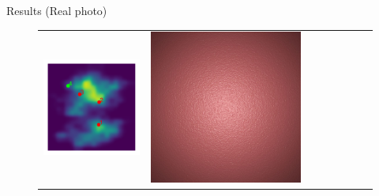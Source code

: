 \documentclass[final]{beamer}
\newlength{\twocolwid}
\newlength{\resultwidth}
\begin{document}
\begin{frame}[t]
\begin{columns}[t]
\begin{column}{\twocolwid}
\begin{block}{Results (Real photo)}
\begin{figure}[t]
\begin{tabular}{ccrclccc}
            		\includegraphics[width=\resultwidth]{images/real/bump/posterior.pdf} &
            		\includegraphics[width=\resultwidth]{images/real/bump/good1.jpg} &

\end{tabular}
\end{figure}
\end{block}
\end{column}
\end{columns}
\end{frame}
\end{document}
